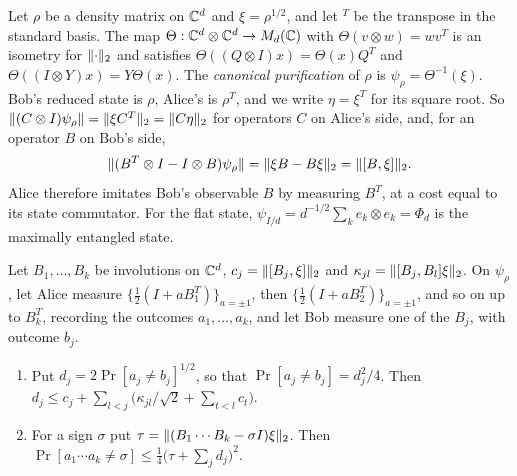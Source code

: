 Let $\rho$ be a density matrix on $\mathbb C^d$ and $\xi=\rho^{1/2}$, and let ${}^T$ be the transpose in the standard basis. The map
$\Theta:\mathbb C^d\otimes\mathbb C^d\to M_d(\mathbb C)$ with $\Theta(v\otimes w)=wv^T$ is an isometry for $\lVert \cdot\rVert_2$ and satisfies
$\Theta((Q\otimes I)x)=\Theta(x)Q^T$ and $\Theta((I\otimes Y)x)=Y\Theta(x)$. The \emph{canonical purification} of $\rho$ is
$\psi_\rho=\Theta^{-1}(\xi)$. Bob's reduced state is $\rho$, Alice's is $\rho^T$, and we write $\eta=\xi^T$ for its square root. So
$\lVert (C\otimes I)\psi_\rho\rVert=\lVert \xi C^T\rVert_2=\lVert C\eta\rVert_2$ for operators $C$ on Alice's side, and, for an operator $B$ on Bob's side,
\begin{equation}\label{transfer:mimic}
\lVert (B^T\otimes I-I\otimes B)\psi_\rho\rVert=\lVert \xi B-B\xi\rVert_2=\lVert [B,\xi]\rVert_2 .
\end{equation}
Alice therefore imitates Bob's observable $B$ by measuring $B^T$, at a cost equal to its state commutator. For the flat state,
$\psi_{I/d}=d^{-1/2}\sum_ke_k\otimes e_k=\Phi_d$ is the maximally entangled state.

\begin{lemma}\label{lem:sequential}
Let $B_1,\dots,B_k$ be involutions on $\mathbb C^d$, $c_j=\lVert [B_j,\xi]\rVert_2$ and $\kappa_{jl}=\lVert [B_j,B_l]\xi\rVert_2$. On $\psi_\rho$, let Alice measure
$\{\frac12(I+aB_1^T)\}_{a=\pm1}$, then $\{\frac12(I+aB_2^T)\}_{a=\pm1}$, and so on up to $B_k^T$, recording the outcomes $a_1,\dots,a_k$, and
let Bob measure one of the $B_j$, with outcome $b_j$.
\begin{enumerate}[label=(\alph*),itemsep=1pt]
\item Put $d_j=2\Pr[a_j\ne b_j]^{1/2}$, so that $\Pr[a_j\ne b_j]=d_j^2/4$. Then
$d_j\le c_j+\sum_{l<j}\bigl(\kappa_{jl}/\sqrt2+\sum_{t<l}c_t\bigr)$.
\item For a sign $\sigma$ put $\tau=\lVert (B_1\cdots B_k-\sigma I)\xi\rVert_2$. Then $\Pr[a_1\cdots a_k\ne\sigma]\le\frac14\bigl(\tau+\sum_jd_j\bigr)^2$.
\end{enumerate}
\end{lemma}

